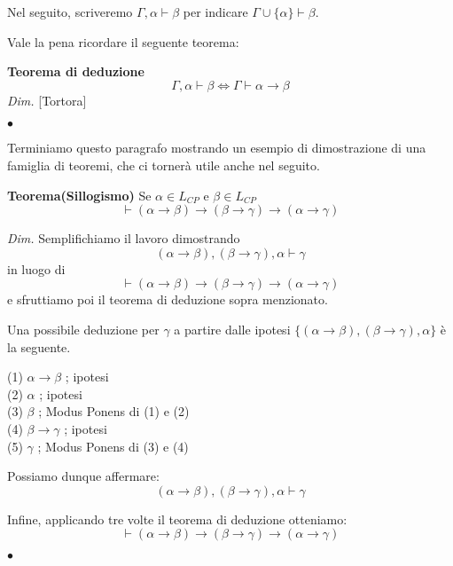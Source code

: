 \documentclass[a4paper, 12pt]{article}
\begin{document}
Nel seguito, scriveremo $\Gamma, \alpha \vdash \beta$
per indicare $\Gamma \cup \{\alpha\} \vdash \beta$.

Vale la pena ricordare il seguente teorema:
\begin{flushleft}
\textbf{Teorema di deduzione}
$$\Gamma, \alpha \vdash \beta \Leftrightarrow \Gamma \vdash \alpha \rightarrow \beta$$
\textit{Dim.} [Tortora]
\begin{flushright}
$\bullet$
\end{flushright}
\end{flushleft}


Terminiamo questo paragrafo mostrando un esempio di dimostrazione di una famiglia
di teoremi, che ci tornerà utile anche nel seguito.

\begin{flushleft}
\textbf{Teorema(Sillogismo)}
Se $\alpha \in L_{CP}$ e $\beta \in L_{CP}$
$$\vdash (\alpha \rightarrow \beta) \rightarrow
        (\beta \rightarrow \gamma) \rightarrow (\alpha \rightarrow \gamma)$$

\textit{Dim.}
Semplifichiamo il lavoro dimostrando
$$(\alpha \rightarrow \beta),(\beta \rightarrow \gamma),\alpha \vdash \gamma$$
in luogo di
$$\vdash (\alpha \rightarrow \beta) \rightarrow
        (\beta \rightarrow \gamma) \rightarrow (\alpha \rightarrow \gamma)$$
e sfruttiamo poi il teorema di deduzione sopra menzionato.

Una possibile deduzione per $\gamma$ a partire dalle ipotesi
$\{(\alpha \rightarrow \beta),(\beta \rightarrow \gamma),\alpha\}$ è la seguente.

(1) $\alpha \rightarrow \beta$ ; ipotesi \\
(2) $\alpha$ ; ipotesi \\
(3) $\beta$ ; Modus Ponens di (1) e (2) \\
(4) $\beta \rightarrow \gamma$ ; ipotesi \\
(5) $\gamma$ ; Modus Ponens di (3) e (4)

Possiamo dunque affermare:
$$(\alpha \rightarrow \beta),(\beta \rightarrow \gamma),\alpha \vdash \gamma$$

Infine, applicando tre volte il teorema di deduzione otteniamo:
$$\vdash (\alpha \rightarrow \beta) \rightarrow (\beta \rightarrow \gamma) \rightarrow (\alpha \rightarrow \gamma)$$

\begin{flushright}
$\bullet$
\end{flushright}
\end{flushleft}
\end{document}
